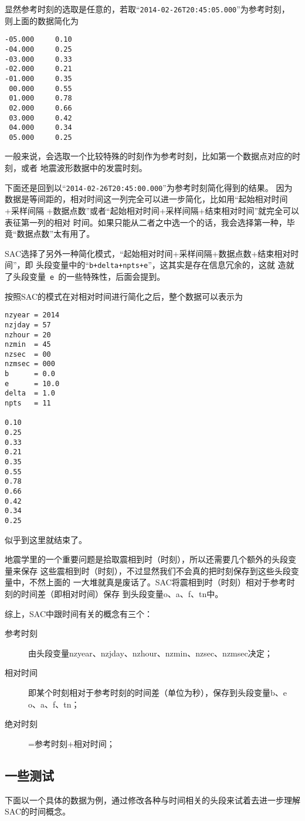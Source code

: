显然参考时刻的选取是任意的，若取``\verb+2014-02-26T20:45:05.000+''为参考时刻，
则上面的数据简化为
\begin{verbatim}
-05.000     0.10
-04.000     0.25
-03.000     0.33
-02.000     0.21
-01.000     0.35
 00.000     0.55
 01.000     0.78
 02.000     0.66
 03.000     0.42
 04.000     0.34
 05.000     0.25
\end{verbatim}

一般来说，会选取一个比较特殊的时刻作为参考时刻，比如第一个数据点对应的时刻，或者
地震波形数据中的发震时刻。

下面还是回到以``\verb+2014-02-26T20:45:00.000+''为参考时刻简化得到的结果。
因为数据是等间距的，相对时间这一列完全可以进一步简化，比如用``起始相对时间+采样间隔
+数据点数''或者``起始相对时间+采样间隔+结束相对时间''就完全可以表征第一列的相对
时间。如果只能从二者之中选一个的话，我会选择第一种，毕竟``数据点数''太有用了。

SAC选择了另外一种简化模式，``起始相对时间+采样间隔+数据点数+结束相对时间''，即
头段变量中的``\verb|b+delta+npts+e|''，这其实是存在信息冗余的，这就
造就了头段变量~\verb+e+~的一些特殊性，后面会提到。

按照SAC的模式在对相对时间进行简化之后，整个数据可以表示为
\begin{verbatim}
nzyear = 2014
nzjday = 57
nzhour = 20
nzmin  = 45
nzsec  = 00
nzmsec = 000
b      = 0.0
e      = 10.0
delta  = 1.0
npts   = 11

0.10
0.25
0.33
0.21
0.35
0.55
0.78
0.66
0.42
0.34
0.25
\end{verbatim}

似乎到这里就结束了。

地震学里的一个重要问题是拾取震相到时（时刻），所以还需要几个额外的头段变量来保存
这些震相到时（时刻），不过显然我们不会真的把时刻保存到这些头段变量中，不然上面的
一大堆就真是废话了。SAC将震相到时（时刻）相对于参考时刻的时间差（即相对时间）保存
到头段变量o、a、f、tn中。

综上，SAC中跟时间有关的概念有三个：
\begin{description}
    \item [参考时刻] 由头段变量nzyear、nzjday、nzhour、nzmin、nzsec、nzmsec决定；
    \item [相对时间] 即某个时刻相对于参考时刻的时间差（单位为秒），保存到头段变量b、e
    o、a、f、tn；
    \item [绝对时刻] =参考时刻+相对时间；
\end{description}

\subsection{一些测试}
下面以一个具体的数据为例，通过修改各种与时间相关的头段来试着去进一步理解SAC的时间概念。

